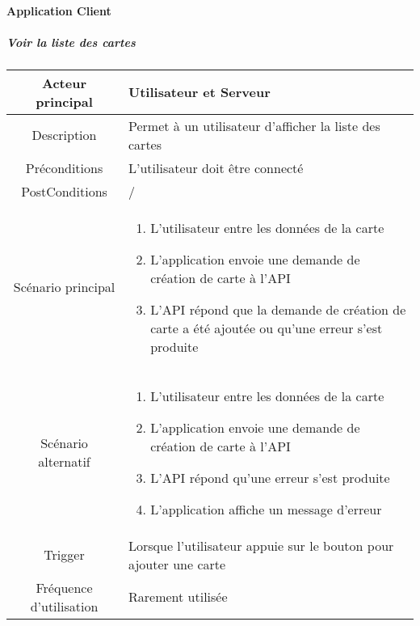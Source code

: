 \documentclass{article}
\begin{document}

\paragraph{Application Client}

\subparagraph{Voir la liste des cartes}
    \begin{table}[h]
        \begin{tabular}{|c|p{10cm}|}
        \hline
        Acteur principal& Utilisateur et Serveur \\
        \hline
        Description& Permet à un utilisateur d'afficher la liste des cartes \\
        \hline
        Préconditions& L'utilisateur doit être connecté  \\
        \hline
        PostConditions&  /    \\
        \hline
        Scénario principal& 
                \begin{enumerate}
                    \item L'utilisateur entre les données de la carte
                    \item L'application envoie une demande de création de carte à l'API
                    \item L'API répond que la demande de création de carte a été ajoutée ou qu'une erreur s'est produite
                \end{enumerate}     \\
        \hline
        Scénario alternatif& 
            \begin{enumerate}
                \item L'utilisateur entre les données de la carte
                \item L'application envoie une demande de création de carte à l'API
                \item L'API répond qu'une erreur s'est produite
                \item L'application affiche un message d'erreur
            \end{enumerate}     \\
        \hline
        Trigger&  Lorsque l'utilisateur appuie sur le bouton pour ajouter une carte   \\
        \hline
        Fréquence d'utilisation& Rarement utilisée  \\
        \hline
        \end{tabular}
    \end{table}
\end{document}
